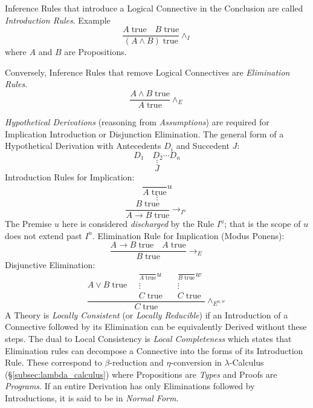 \documentclass{article}
\begin{document}
Inference Rules that introduce a Logical Connective in the Conclusion
are called \emph{Introduction Rules}. Example
\[
    {
        \frac{A\;\mathrm{true} \quad B\;\mathrm{true}}
        {(A \wedge B)\;\mathrm{true}}
    } \wedge_I
\]
where $A$ and $B$ are Propositions.

Conversely, Inference Rules that remove Logical Connectives are
\emph{Elimination Rules}.
\[
    {
        \frac{A \wedge B\;\mathrm{true}}
        {A\;\mathrm{true}}
    } \wedge_E
\]

\emph{Hypothetical Derivations} (reasoning from \emph{Assumptions})
are required for Implication Introduction or Disjunction
Elimination. The general form of a Hypothetical Derivation with
Antecedents $D_i$ and Succedent $J$:
\[
    D_1 \quad D_2 \cdots D_n
\]\[
    \vdots
\]\[
    J
\]
Introduction Rules for Implication:
\[
    {
        \frac{}
        {A\;\mathrm{true}}
    } u
\]\[
    \vdots
\]\[
    {
        \frac{B\;\mathrm{true}}
        {A \rightarrow B\;\mathrm{true}}
    } \rightarrow_{I^u}
\]
The Premise $u$ here is considered \emph{discharged} by the Rule
$I^u$; that is the scope of $u$ does not extend past $I^u$.
Elimination Rule for Implication (Modus Ponens):
\[
    {
        \frac{A \rightarrow B\;\mathrm{true} \quad A\;\mathrm{true}}
        {B\;\mathrm{true}}
    } \rightarrow_{E}
\]
Disjunctive Elimination:
\[
    \frac{
    A \vee B\;\mathrm{true} \quad
    \begin{matrix}
        {
            \frac{}
            {A\;\mathrm{true}}
        }u \\
        \vdots \\
        C\;\mathrm{true}
    \end{matrix}
    \quad
    \begin{matrix}
        {
            \frac{}
            {B\;\mathrm{true}}
        }w \\
        \vdots \\
        C\;\mathrm{true}
    \end{matrix}
    }{ C\;\mathrm{true}}\wedge_{E^{u,w}}
\]
A Theory is \emph{Locally Consistent} (or \emph{Locally Reducible}) if
an Introduction of a Connective followed by its Elimination can be
equivalently Derived without these steps.  The dual to Local
Consistency is \emph{Local Completeness} which states that Elimination
rules can decompose a Connective into the forms of its Introduction
Rule. These correspond to $\beta$-reduction and $\eta$-conversion in
$\lambda$-Calculus (\S\ref{subsec:lambda_calculus}) where Propositions
are \emph{Types} and Proofs are \emph{Programs}. If an entire
Derivation has only Eliminations followed by Introductions, it is said
to be in \emph{Normal Form}.
\end{document}
